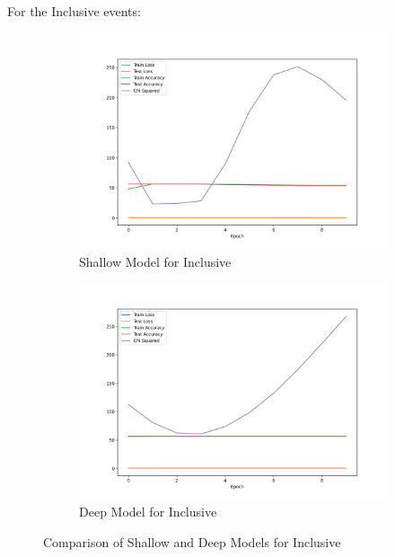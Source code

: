 \documentclass{article}
\begin{document}
For the Inclusive events:
\begin{figure}[H]
    \centering
    \begin{subfigure}[b]{0.45\textwidth}
        \includegraphics[width=\textwidth]{graphs/nn_incl_metrics.png}
        \caption{Shallow Model for Inclusive}
        \label{fig:accuracy_loss_incl}
    \end{subfigure}
    \hfill
    \begin{subfigure}[b]{0.45\textwidth}
        \includegraphics[width=\textwidth]{graphs/nn_incl_metrics_deeper.png}
        \caption{Deep Model for Inclusive}
        \label{fig:accuracy_loss_incl_deep}
    \end{subfigure}
    \caption{Comparison of Shallow and Deep Models for Inclusive}
\end{figure}
\end{document}
